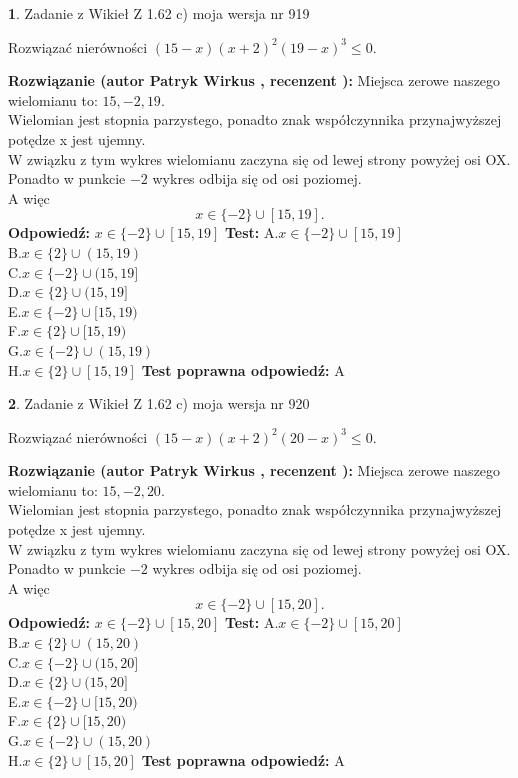 \documentclass[12pt, a4paper]{article}
\theoremstyle{definition} %
\newtheorem{zad}{}
\newcommand{\zadStart}[1]{\begin{zad}#1\newline}
\newcommand{\zadStop}{\end{zad}}
\newcommand{\rozwStart}[2]{\noindent \textbf{Rozwiązanie (autor #1 , recenzent #2): }\newline}
\newcommand{\rozwStop}{\newline}
\newcommand{\odpStart}{\noindent \textbf{Odpowiedź:}\newline}
\newcommand{\odpStop}{\newline}
\newcommand{\testStart}{\noindent \textbf{Test:}\newline}
\newcommand{\testStop}{\newline}
\newcommand{\kluczStart}{\noindent \textbf{Test poprawna odpowiedź:}\newline}
\newcommand{\kluczStop}{\newline}
\begin{document}
\zadStart{Zadanie z Wikieł Z 1.62 c) moja wersja nr 919}

Rozwiązać nierówności $(15-x)(x+2)^{2}(19-x)^{3}\le0$.
\zadStop
\rozwStart{Patryk Wirkus}{}
Miejsca zerowe naszego wielomianu to: $15, -2, 19$.\\
Wielomian jest stopnia parzystego, ponadto znak współczynnika przy\linebreak najwyższej potędze x jest ujemny.\\ W związku z tym wykres wielomianu zaczyna się od lewej strony powyżej osi OX.\\
Ponadto w punkcie $-2$ wykres odbija się od osi poziomej.\\
A więc $$x \in \{-2\} \cup [15,19].$$
\rozwStop
\odpStart
$x \in \{-2\} \cup [15,19]$
\odpStop
\testStart
A.$x \in \{-2\} \cup [15,19]$\\
B.$x \in \{2\} \cup (15,19)$\\
C.$x \in \{-2\} \cup (15,19]$\\
D.$x \in \{2\} \cup (15,19]$\\
E.$x \in \{-2\} \cup [15,19)$\\
F.$x \in \{2\} \cup [15,19)$\\
G.$x \in \{-2\} \cup (15,19)$\\
H.$x \in \{2\} \cup [15,19]$
\testStop
\kluczStart
A
\kluczStop



\zadStart{Zadanie z Wikieł Z 1.62 c) moja wersja nr 920}

Rozwiązać nierówności $(15-x)(x+2)^{2}(20-x)^{3}\le0$.
\zadStop
\rozwStart{Patryk Wirkus}{}
Miejsca zerowe naszego wielomianu to: $15, -2, 20$.\\
Wielomian jest stopnia parzystego, ponadto znak współczynnika przy\linebreak najwyższej potędze x jest ujemny.\\ W związku z tym wykres wielomianu zaczyna się od lewej strony powyżej osi OX.\\
Ponadto w punkcie $-2$ wykres odbija się od osi poziomej.\\
A więc $$x \in \{-2\} \cup [15,20].$$
\rozwStop
\odpStart
$x \in \{-2\} \cup [15,20]$
\odpStop
\testStart
A.$x \in \{-2\} \cup [15,20]$\\
B.$x \in \{2\} \cup (15,20)$\\
C.$x \in \{-2\} \cup (15,20]$\\
D.$x \in \{2\} \cup (15,20]$\\
E.$x \in \{-2\} \cup [15,20)$\\
F.$x \in \{2\} \cup [15,20)$\\
G.$x \in \{-2\} \cup (15,20)$\\
H.$x \in \{2\} \cup [15,20]$
\testStop
\kluczStart
A
\kluczStop
\end{document}
